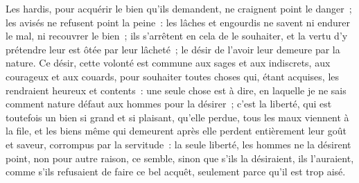 \documentclass[french,twoside]{book} %
\begin{document}
Les hardis, pour acquérir le bien qu’ils demandent, ne craignent point le danger ; les avisés ne refusent point la peine : les lâches et engourdis ne savent ni endurer le mal, ni recouvrer le bien ; ils s’arrêtent en cela de le souhaiter, et la vertu d’y prétendre leur est ôtée par leur lâcheté ; le désir de l’avoir leur demeure par la nature. Ce désir, cette volonté est commune aux sages et aux indiscrets, aux courageux et aux couards, pour souhaiter toutes choses qui, étant acquises, les rendraient heureux et contents : une seule chose est à dire, en laquelle je ne sais comment nature défaut aux hommes pour la désirer ; c’est la liberté, qui est toutefois un bien si grand et si plaisant, qu’elle perdue, tous les maux viennent à la file, et les biens même qui demeurent après elle perdent entièrement leur goût et saveur, corrompus par la servitude : la seule liberté, les hommes ne la désirent point, non pour autre raison, ce semble, sinon que s’ils la désiraient, ils l’auraient, comme s’ils refusaient de faire ce bel acquêt, seulement parce qu’il est trop aisé.\par
\end{document}
